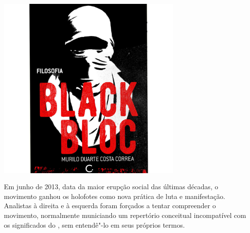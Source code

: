 \vfill

\hspace*{-.4cm}\begin{minipage}[c]{.5\linewidth}
\small{
{}}
\end{minipage}

\pagebreak

\hspace{.5cm}

\begin{center}
\hspace*{.5cm}\includegraphics[width=92mm]{./grid/black.jpg}
\end{center}

\hspace*{-7cm}\hrulefill\hspace*{-7cm}

\medskip

\noindent{}Em junho de 2013, data da maior erupção social das últimas décadas, o movimento {} ganhou os holofotes como nova prática de luta e manifestação. Analistas à direita e à esquerda foram forçados a tentar compreender o movimento, normalmente municiando um repertório conceitual incompatível com os significados do {}, sem entendê"-lo em seus próprios termos.

